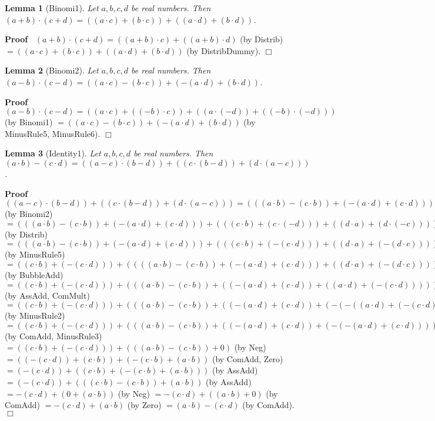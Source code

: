 \documentclass{article}
\newenvironment{forthel}{\begin{leftbar}}{\end{leftbar}}
\newenvironment{proof}{\noindent\textbf{Proof\ }}{\hspace*{\fill}$\Box$\medskip}
\newtheorem{lemma}{Lemma}
\newcommand{\dotequal}{=}
\begin{document}
\begin{forthel}
	\begin{lemma}[Binomi1]
	Let $a,b,c,d$ be real numbers.
	Then $(a + b) \cdot (c + d) = ((a \cdot c) + (b \cdot c)) + ((a \cdot d) + (b \cdot d))$.
	\end{lemma}
	\begin{proof}
	$(a + b) \cdot (c + d) \dotequal ((a + b) \cdot c) + ((a + b) \cdot d)$ (by Distrib)
	$\dotequal ((a \cdot c) + (b \cdot c)) + ((a \cdot d) + (b \cdot d))$ (by DistribDummy).
	\end{proof}
	
	\begin{lemma}[Binomi2]
	Let $a,b,c,d$ be real numbers.
	Then $(a - b) \cdot (c - d) = ((a \cdot c) - (b \cdot c)) + (-(a \cdot d) + (b \cdot d))$.
	\end{lemma}
	\begin{proof}
	$(a - b) \cdot (c - d) \dotequal ((a \cdot c) + ((-b) \cdot c)) + ((a \cdot (-d)) + ((-b) \cdot (-d)))$ (by Binomi1)
	$\dotequal ((a \cdot c) - (b \cdot c)) + (-(a \cdot d) + (b \cdot d))$ (by MinusRule5, MinusRule6).
	\end{proof}
	
	
	
	\begin{lemma}[Identity1]
	Let $a,b,c,d$ be real numbers. 
	Then $(a \cdot b) - (c \cdot d) = ((a - c) \cdot (b - d)) + ((c \cdot (b - d)) + (d \cdot (a - c)))$.
	\end{lemma}
	\begin{proof}
	$((a - c) \cdot (b - d)) + ((c \cdot (b - d)) + (d \cdot (a - c))) 
	\dotequal (((a \cdot b) - (c \cdot b)) + (-(a \cdot d) + (c \cdot d))) + ((c \cdot (b - d)) + (d \cdot (a - c)))$ (by Binomi2)
	$\dotequal (((a \cdot b) - (c \cdot b)) + (-(a \cdot d) + (c \cdot d))) + (((c \cdot b) + (c \cdot (-d))) + ((d \cdot a) + (d \cdot (-c))))$ (by Distrib)
	$\dotequal (((a \cdot b) - (c \cdot b)) + (-(a \cdot d) + (c \cdot d))) + (((c \cdot b) + (-(c \cdot d))) + ((d \cdot a) + (-(d \cdot c))))$ (by MinusRule5)
	$\dotequal ((c \cdot b) + (-(c \cdot d))) + ((((a \cdot b) - (c \cdot b)) + (-(a \cdot d) + (c \cdot d))) + ((d \cdot a) + (-(d \cdot c))))$ (by BubbleAdd)
	$\dotequal ((c \cdot b) + (-(c \cdot d))) + (((a \cdot b) - (c \cdot b)) + ((-(a \cdot d) + (c \cdot d)) + ((a \cdot d) + (-(c \cdot d)))))$ (by AssAdd, ComMult)
	$\dotequal ((c \cdot b) + (-(c \cdot d))) + (((a \cdot b) - (c \cdot b)) + ((-(a \cdot d) + (c \cdot d)) + (-(-((a \cdot d) + (-(c \cdot d)))))))$ (by MinusRule2)
	$\dotequal ((c \cdot b) + (-(c \cdot d))) + (((a \cdot b) - (c \cdot b)) + ((-(a \cdot d) + (c \cdot d)) + (-(-(a \cdot d) + (c \cdot d)))))$ (by ComAdd, MinusRule3)
	$\dotequal ((c \cdot b) + (-(c \cdot d))) + (((a \cdot b) - (c \cdot b)) + 0)$ (by Neg)
	$\dotequal ((-(c \cdot d)) + (c \cdot b)) + (-(c \cdot b) + (a \cdot b))$ (by ComAdd, Zero)
	$\dotequal (-(c \cdot d)) + ((c \cdot b) + (-(c \cdot b) + (a \cdot b)))$ (by AssAdd)
	$\dotequal (-(c \cdot d)) + (((c \cdot b) -(c \cdot b)) + (a \cdot b))$ (by AssAdd)
	$\dotequal -(c \cdot d) + (0 + (a \cdot b))$ (by Neg)
	$\dotequal -(c \cdot d) + ((a \cdot b) + 0)$ (by ComAdd)
	$\dotequal -(c \cdot d) + (a \cdot b)$ (by Zero)
	$\dotequal (a \cdot b) - (c \cdot d)$ (by ComAdd).
	\end{proof}
	

\end{forthel}
\end{document}
